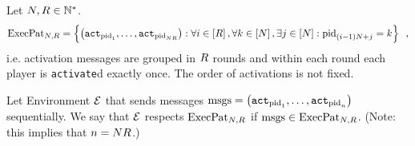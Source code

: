 \begin{definition}
  \label{model:def:execpat}
  Let $N, R \in \mathbb{N}^*$.
  \begin{equation*}
    \mathrm{ExecPat}_{N, R} = \left\{\left(\mathtt{act}_{\mathrm{pid}_1}, \dots,
    \mathtt{act}_{\mathrm{pid}_{N R}}\right) : \forall i \in
    \left[R\right], \forall k \in
    \left[N\right], \exists j \in \left[N\right]: \mathrm{pid}_{(i -
    1) N + j} = k\right\} \enspace,
  \end{equation*}
  i.e. activation messages are grouped in $R$ rounds and within each round
  each player is \texttt{activate}d exactly once. The order of activations is
  not fixed.

  Let Environment $\mathcal{E}$ that sends messages $\mathrm{msgs} =
  \left(\mathtt{act}_{\mathrm{pid}_1}, \dots, \mathtt{act}_{\mathrm{pid}_n}\right)$
  sequentially. We say that $\mathcal{E}$ respects $\mathrm{ExecPat}_{N, R}$ if
  $\mathrm{msgs} \in \mathrm{ExecPat}_{N, R}$. (Note: this implies that
  $n = N R$.)
\end{definition}
